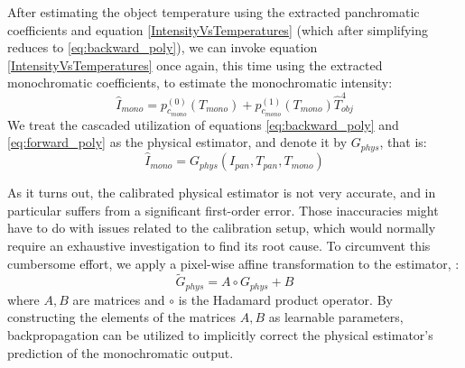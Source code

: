 After estimating the object temperature using the extracted panchromatic coefficients and equation \ref{IntensityVsTemperatures} (which after simplifying reduces to \ref{eq:backward_poly}), we can invoke equation \ref{IntensityVsTemperatures} once again, this time using the extracted monochromatic coefficients, to estimate the monochromatic intensity:
\begin{equation} \label{eq:forward_poly}
  \hat{I}_\mathit{mono} = p^{(0)}_{c_\mathit{mono}}(T_\mathit{mono}) + p^{(1)}_{c_\mathit{mono}}(T_\mathit{mono}) \hat{T}_\mathit{obj}^4
\end{equation}
We treat the cascaded utilization of equations \ref{eq:backward_poly} and \ref{eq:forward_poly} as the physical estimator, and denote it by $G_{\mathit{phys}}$, that is:
\begin{equation}
  \hat{I}_\mathit{mono} = G_{\mathit{phys}}(I_\mathit{pan}, T_\mathit{pan}, T_\mathit{mono})
\end{equation}

As it turns out, the calibrated physical estimator is not very accurate, and in particular suffers from a significant first-order error.
Those inaccuracies might have to do with issues related to the calibration setup, which would normally require an exhaustive investigation to find its root cause.
To circumvent this cumbersome effort, we apply a pixel-wise affine transformation to the estimator, \ie: 
\begin{equation}
  \tilde{G}_{\mathit{phys}} = A \circ G_{\mathit{phys}} + B
\end{equation}
where $A, B$ are matrices and $\circ$ is the Hadamard product operator.
By constructing the elements of the matrices $A, B$ as learnable parameters, backpropagation can be utilized to implicitly correct the physical estimator's prediction of the monochromatic output.

